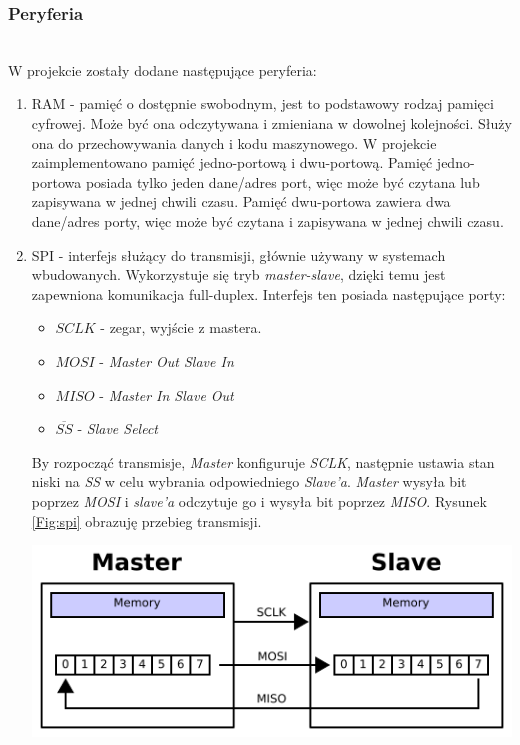 \documentclass[11pt,a4paper]{article}
\begin{document}
		\subsubsection{Peryferia}
		\hspace{5mm}
			\\W projekcie zostały dodane następujące peryferia:
			\begin{enumerate}
			\item RAM - pamięć o dostępnie swobodnym, jest to podstawowy rodzaj pamięci cyfrowej. Może być ona odczytywana i zmieniana w dowolnej kolejności. Służy ona do przechowywania danych i kodu maszynowego. W projekcie zaimplementowano pamięć jedno-portową i dwu-portową. Pamięć jedno-portowa posiada tylko jeden dane/adres port, więc może być czytana lub zapisywana w jednej chwili czasu. Pamięć dwu-portowa zawiera dwa dane/adres porty, więc może być czytana i zapisywana w jednej chwili czasu.\cite{ram_book}
			\item SPI - interfejs służący do transmisji, głównie używany w systemach wbudowanych. Wykorzystuje się tryb \textit{master-slave}, dzięki temu jest zapewniona komunikacja full-duplex. Interfejs ten posiada następujące porty:
			\begin{itemize}
			\item $SCLK$ - zegar, wyjście z mastera.
			\item $MOSI$ - \textit{Master Out Slave In}
			\item $MISO$ - \textit{Master In Slave Out}
			\item $\overline{SS}$ - \textit{Slave Select}
			\end{itemize}
			 By rozpocząć transmisje, \textit{Master} konfiguruje \textit{SCLK}, następnie ustawia stan niski na \textit{SS} w celu wybrania odpowiedniego \textit{Slave'a}. \textit{Master} wysyła bit poprzez \textit{MOSI} i \textit{slave'a} odczytuje go i wysyła bit poprzez \textit{MISO}. Rysunek \ref{Fig:spi} obrazuję przebieg transmisji\cite{spi_book}.
			 \begin{samepage}
				\nopagebreak
				\begin{center}
					\includegraphics[width=13cm]{./rysunki/spi.png}
				\end{center}
			\end{samepage}
			

\end{enumerate}
\end{document}
